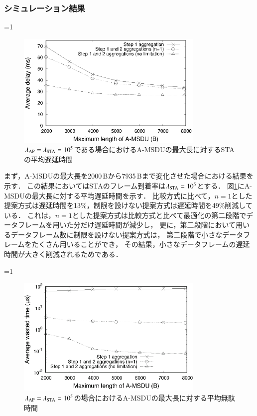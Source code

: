 \documentclass[master]{kuisthesis}		%
\newcounter{flagFig}
\begin{document}
		\subsubsection{シミュレーション結果}
			\ifnum\value{flagFig}=1 {\begin{figure}[htbp]
				\begin{center}
					\includegraphics[width=0.8\textwidth]{graph/dly_max.eps}
					\caption{$\lambda_{\rm AP}=\lambda_{\rm STA}=10^5$である場合におけるA-MSDUの最大長に対するSTAの平均遅延時間}
					\label{fig:dly_max}
				\end{center}
			\end{figure}}\fi
			まず，A-MSDUの最大長を2000\,Bから7935\,Bまで変化させた場合における結果を示す．
			この結果においてはSTAのフレーム到着率は$\lambda_{\rm STA}=10^5$とする．
			図\ref{fig:dly_max}にA-MSDUの最大長に対する平均遅延時間を示す．
			比較方式に比べて，$n=1$とした提案方式は遅延時間を13\%，制限を設けない提案方式は遅延時間を49\%削減している．
			これは，$n=1$とした提案方式は比較方式と比べて最適化の第二段階でデータフレームを用いた分だけ遅延時間が減少し，
			更に，第二段階において用いるデータフレーム数に制限を設けない提案方式は，
			第二段階で小さなデータフレームをたくさん用いることができ，
			その結果，小さなデータフレームの遅延時間が大きく削減されるためである．
			\par
			\ifnum\value{flagFig}=1 {\begin{figure}[htbp]
				\begin{center}
					\includegraphics[width=0.8\textwidth]{graph/wst_max.eps}
					\caption{$\lambda_{\rm AP}=\lambda_{\rm STA}=10^5$の場合におけるA-MSDUの最大長に対する平均無駄時間}
					\label{fig:wst_max}
				\end{center}
			\end{figure}}\fi
\end{document}
